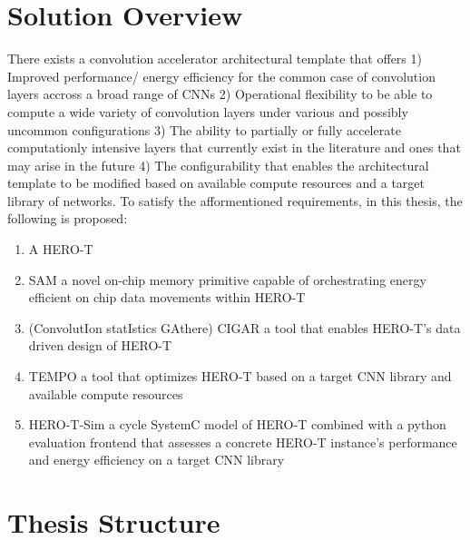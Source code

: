 \section{Solution Overview}
\label{chap:intro:solution_overview}

There exists a convolution accelerator architectural template that offers 1)
Improved performance/ energy efficiency for the common case of convolution
layers accross a broad range of \ac{CNN}s 2) Operational flexibility to be able
to compute a wide variety of convolution layers under various and possibly
uncommon configurations 3) The ability to partially or fully accelerate
computationly intensive layers that currently exist in the literature and ones
that may arise in the future 4) The configurability that enables the
architectural template to be modified based on available compute resources and a
target library of networks. To satisfy the afformentioned requirements, in this
thesis, the following is proposed: 
\begin{enumerate}
    \item A \ac{HERO-T}
    \item \ac{SAM} a novel on-chip memory primitive capable of orchestrating
    energy efficient on chip data movements within \ac{HERO-T}
    \item (ConvolutIon statIstics GAthere) \ac{CIGAR} a tool that enables \ac{HERO-T}'s data driven design of \ac{HERO-T}
    \item \ac{TEMPO} a tool that optimizes \ac{HERO-T} based on a target
    \ac{CNN} library and available compute resources 
    \item \ac{HERO-T-Sim} a cycle SystemC model of \ac{HERO-T} combined with a
python evaluation frontend that assesses a concrete \ac{HERO-T} instance's
performance and energy efficiency on a target \ac{CNN} library

  \end{enumerate}
  

\section{Thesis Structure}
\label{chap:intro:thesis_structure}

